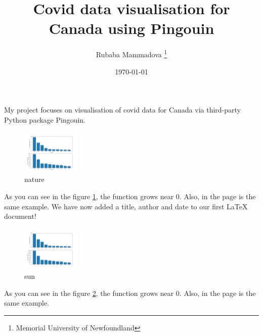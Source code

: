 \documentclass[12pt, letterpaper, twoside]{article}
\title{Covid data visualisation for Canada using Pingouin}
\author{Rubaba Mammadova \thanks{Memorial University of Newfoundland}}
\date{\today}
\begin{document}
\maketitle
My project focuses on visualisation of covid data for Canada via third-party Python package Pingouin.
 \begin{figure}[h]
    \centering
    \includegraphics[width=0.25\textwidth]{plot1.jpg}
    \caption{nature}
    \label{fig:myplot1 label}
\end{figure}
 
As you can see in the figure \ref{fig:myplot1 label}, the 
function grows near 0. Also, in the page \pageref{fig:myplot1 label} 
is the same example.
We have now added a title, author and date to our first \LaTeX{} document!
 \begin{figure}[h]
    \centering
    \includegraphics[width=0.25\textwidth]{plot2.jpg}
    \caption{sun}
    \label{fig:sun}
\end{figure}
 
As you can see in the figure \ref{fig:sun}, the 
function grows near 0. Also, in the page \pageref{fig:sun} 
is the same example.
\end{document}
